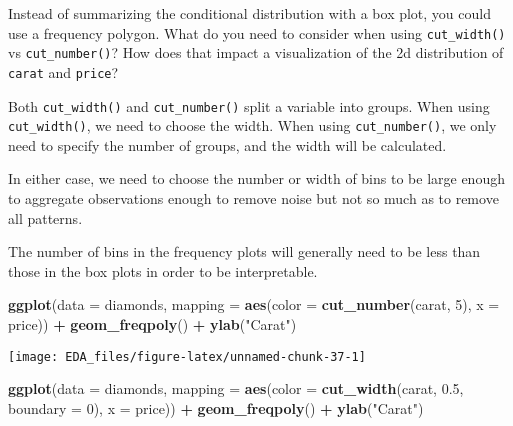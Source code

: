 \documentclass[]{book}
\newenvironment{Shaded}{\begin{snugshade}}{\end{snugshade}}
\newcommand{\DataTypeTok}[1]{\textcolor[rgb]{0.13,0.29,0.53}{#1}}
\newcommand{\DecValTok}[1]{\textcolor[rgb]{0.00,0.00,0.81}{#1}}
\newcommand{\FloatTok}[1]{\textcolor[rgb]{0.00,0.00,0.81}{#1}}
\newcommand{\KeywordTok}[1]{\textcolor[rgb]{0.13,0.29,0.53}{\textbf{#1}}}
\newcommand{\NormalTok}[1]{#1}
\newcommand{\OperatorTok}[1]{\textcolor[rgb]{0.81,0.36,0.00}{\textbf{#1}}}
\newcommand{\StringTok}[1]{\textcolor[rgb]{0.31,0.60,0.02}{#1}}
\theoremstyle{plain}
\theoremstyle{remark}
\theoremstyle{definition}
\theoremstyle{definition}
\theoremstyle{definition}
\theoremstyle{remark}
\begin{document}
Instead of summarizing the conditional distribution with a box plot, you
could use a frequency polygon. What do you need to consider when using
\texttt{cut\_width()} vs \texttt{cut\_number()}? How does that impact a
visualization of the 2d distribution of \texttt{carat} and
\texttt{price}?

Both \texttt{cut\_width()} and \texttt{cut\_number()} split a variable
into groups. When using \texttt{cut\_width()}, we need to choose the
width. When using \texttt{cut\_number()}, we only need to specify the
number of groups, and the width will be calculated.

In either case, we need to choose the number or width of bins to be
large enough to aggregate observations enough to remove noise but not so
much as to remove all patterns.

The number of bins in the frequency plots will generally need to be less
than those in the box plots in order to be interpretable.

\begin{Shaded}
\begin{Highlighting}[]
\KeywordTok{ggplot}\NormalTok{(}\DataTypeTok{data =}\NormalTok{ diamonds,}
       \DataTypeTok{mapping =} \KeywordTok{aes}\NormalTok{(}\DataTypeTok{color =} \KeywordTok{cut_number}\NormalTok{(carat, }\DecValTok{5}\NormalTok{), }\DataTypeTok{x =}\NormalTok{ price)) }\OperatorTok{+}
\StringTok{  }\KeywordTok{geom_freqpoly}\NormalTok{() }\OperatorTok{+}
\StringTok{  }\KeywordTok{ylab}\NormalTok{(}\StringTok{"Carat"}\NormalTok{)}
\end{Highlighting}
\end{Shaded}

\begin{center}\texttt{[image: EDA\_files/figure-latex/unnamed-chunk-37-1]} \end{center}

\begin{Shaded}
\begin{Highlighting}[]
\KeywordTok{ggplot}\NormalTok{(}\DataTypeTok{data =}\NormalTok{ diamonds,}
       \DataTypeTok{mapping =} \KeywordTok{aes}\NormalTok{(}\DataTypeTok{color =} \KeywordTok{cut_width}\NormalTok{(carat, }\FloatTok{0.5}\NormalTok{, }\DataTypeTok{boundary =} \DecValTok{0}\NormalTok{), }\DataTypeTok{x =}\NormalTok{ price)) }\OperatorTok{+}
\StringTok{  }\KeywordTok{geom_freqpoly}\NormalTok{() }\OperatorTok{+}
\StringTok{  }\KeywordTok{ylab}\NormalTok{(}\StringTok{"Carat"}\NormalTok{)}
\end{Highlighting}
\end{Shaded}
\end{document}
